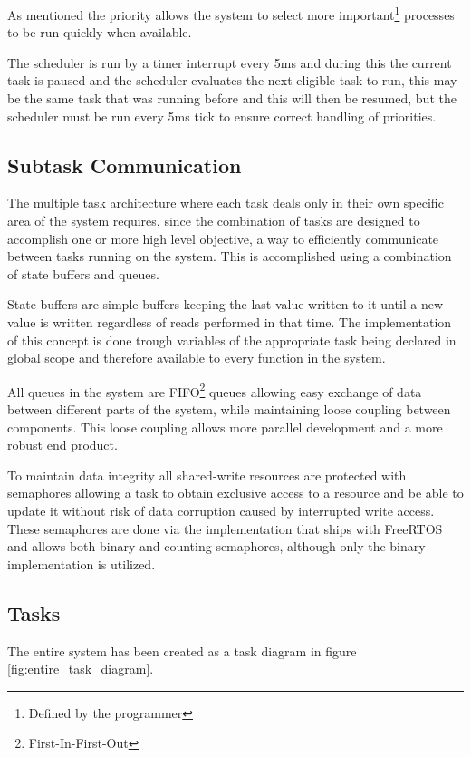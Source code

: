 \documentclass[../../../main]{subfiles}
\begin{document}
As mentioned the priority allows the system to select more important\footnote{Defined by the programmer} processes to be run quickly when available.  

The scheduler is run by a timer interrupt every 5ms and during this the current task is paused and the scheduler evaluates the next eligible task to run, this may be the same task that was running before and this will then be resumed, but the scheduler must be run every 5ms tick to ensure correct handling of priorities.

\subsection{Subtask Communication}

The multiple task architecture where each task deals only in their own specific area of the system requires, since the combination of tasks are designed to accomplish one or more high level objective, a way to efficiently communicate between tasks running on the system. 
This is accomplished using a combination of state buffers and queues. 

State buffers are simple buffers keeping the last value written to it until a new value is written regardless of reads performed in that time. The implementation of this concept is done trough variables of the appropriate task being declared in global scope and therefore available to every function in the system.

All queues in the system are FIFO\footnote{First-In-First-Out} queues allowing easy exchange of data between different parts of the system, while maintaining loose coupling between components. This loose coupling allows more parallel development and a more robust end product. 

To maintain data integrity all shared-write resources are protected with semaphores allowing a task to obtain exclusive access to a resource and be able to update it without risk of data corruption caused by interrupted write access.
These semaphores are done via the implementation that ships with FreeRTOS and allows both binary and counting semaphores, although only the binary implementation is utilized.



\subsection{Tasks}

The entire system has been created as a task diagram in figure \ref{fig:entire_task_diagram}. 
\end{document}
